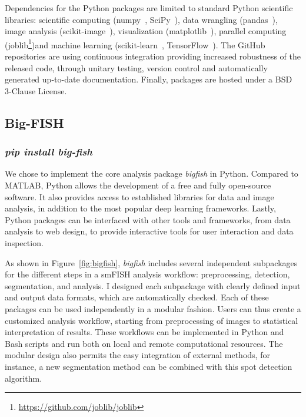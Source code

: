 Dependencies for the Python packages are limited to standard Python scientific libraries: scientific computing (numpy~\cite{2020NumPy}, SciPy~\cite{2020SciPy}), data wrangling (pandas~\cite{mckinney_pandas_2010}), image analysis (scikit-image~\cite{walt_scikit-image_2014}), visualization (matplotlib~\cite{hunter_matplotlib_2007}), parallel computing (joblib\footnote{\url{https://github.com/joblib/joblib}})and machine learning (scikit-learn~\cite{pedregosa11a_scikitlearn}, TensorFlow~\cite{tensorflow_2015}).
The GitHub repositories are using continuous integration providing increased robustness of the released code, through unitary testing, version control and automatically generated up-to-date documentation.
Finally, packages are hosted under a BSD 3-Clause License.

\subsection{Big-FISH}
\label{subsec:bigfish}

\subsubsection{\emph{pip install big-fish}}

We chose to implement the core analysis package \emph{bigfish} in Python.
Compared to MATLAB, Python allows the development of a free and fully open-source software.
It also provides access to established libraries for data and image analysis, in addition to the most popular deep learning frameworks.
Lastly, Python packages can be interfaced with other tools and frameworks, from data analysis to web design, to provide interactive tools for user interaction and data inspection.

As shown in Figure~\ref{fig:bigfish}, \emph{bigfish} includes several independent subpackages for the different steps in a \ac{smFISH} analysis workflow: preprocessing, detection, segmentation, and analysis.
I designed each subpackage with clearly defined input and output data formats, which are automatically checked.
Each of these packages can be used independently in a modular fashion.
Users can thus create a customized analysis workflow, starting from preprocessing of images to statistical interpretation of results.
These workflows can be implemented in Python and Bash scripts and run both on local and remote computational resources.
The modular design also permits the easy integration of external methods, for instance, a new segmentation method can be combined with this spot detection algorithm.

